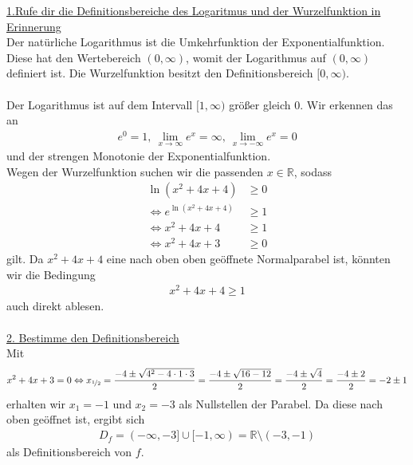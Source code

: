 \underline{1.Rufe dir die Definitionsbereiche des Logaritmus und der Wurzelfunktion in Erinnerung}\\
Der natürliche Logarithmus ist die Umkehrfunktion der Exponentialfunktion.
Diese hat den Wertebereich $(0, \infty)$, womit der Logarithmus auf $(0,\infty)$ definiert ist.
Die Wurzelfunktion besitzt den Definitionsbereich $[0,\infty)$.\\
\\
Der Logarithmus ist auf dem Intervall $[1,\infty)$ größer gleich $0$. Wir erkennen das an
\begin{align*}
e^0 = 1, \ \lim \limits_{x \rightarrow \infty} e^x = \infty,
\ \lim \limits_{x \rightarrow -\infty} e^x = 0
\end{align*}
und der strengen Monotonie der Exponentialfunktion.\\
Wegen der Wurzelfunktion suchen wir die passenden $x \in \mathbb{R}$, sodass
\begin{align*}
\ln(x^2+4x+4) &\geq 0\\
\Leftrightarrow
e^{\ln(x^2+4x+4)} &\geq 1\\
\Leftrightarrow
x^2 +4x +4 &\geq 1\\
\Leftrightarrow
x^2 +4x +3 &\geq 0
\end{align*}
gilt. Da $x^2+4x+4$ eine nach oben oben geöffnete Normalparabel ist, könnten wir die Bedingung 
\begin{align*}
x^2 +4x +4 \geq 1
\end{align*}
auch direkt ablesen.
\\
\\
\underline{2. Bestimme den Definitionsbereich}\\
Mit
\begin{align*}
x^2 +4x+3 =0
\Leftrightarrow
x_{\nicefrac{1}{2}}
= \frac{-4 \pm \sqrt{4^2 - 4 \cdot 1 \cdot 3}}{2} 
= \frac{-4 \pm \sqrt{16 -12 }}{2}
= \frac{-4 \pm \sqrt{4}}{2}
= \frac{-4 \pm 2}{2}
= -2 \pm 1
\end{align*}
erhalten wir $x_1 = -1$ und $x_2 = -3$ als Nullstellen der Parabel. Da diese nach oben geöffnet ist, ergibt sich 
\begin{align*}
D_f = (-\infty,-3]\cup [-1,\infty)
= \mathbb{R} \setminus (-3,-1)
\end{align*}
als Definitionsbereich von $f$.

\newpage

